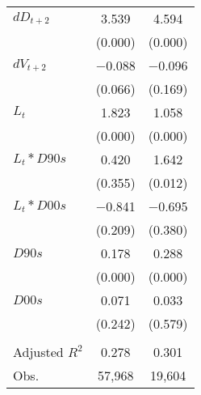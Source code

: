 {\begin{longtable}{l*{2}{c}}
\addlinespace
$ dD_{t+2}$ &       3.539&       4.594\\
&     (0.000)&     (0.000)\\
\addlinespace
$ dV_{t+2}$ &    $-$0.088&    $-$0.096\\
&     (0.066)&     (0.169)\\
\addlinespace
$ L_{t}$    &       1.823&       1.058\\
&     (0.000)&     (0.000)\\
\addlinespace
$ L_{t} * D90s$&       0.420&       1.642\\
&     (0.355)&     (0.012)\\
\addlinespace
$ L_{t} * D00s$&    $-$0.841&    $-$0.695\\
&     (0.209)&     (0.380)\\
\addlinespace
$ D90s$     &       0.178&       0.288\\
&     (0.000)&     (0.000)\\
\addlinespace
$ D00s$     &       0.071&       0.033\\
&     (0.242)&     (0.579)\\
\\
Adjusted $ R^{2}$&       0.278&       0.301\\
Obs.        &      57,968&      19,604\\
\bottomrule
\end{longtable}
}
